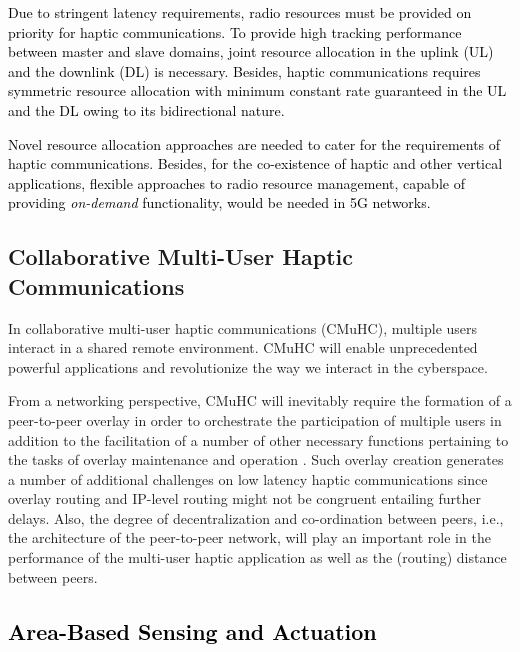 \documentclass[journal]{IEEEtran}
\begin{document}
\textcolor{black} {Due to stringent latency requirements, radio resources must be provided on priority for haptic communications. To provide high tracking performance between master and slave domains, joint resource allocation in the uplink (UL) and the downlink (DL) is necessary. Besides, haptic communications requires symmetric resource allocation with minimum constant rate guaranteed in the UL and the DL owing to its bidirectional nature.}

\textcolor{black}{Novel resource allocation approaches are needed to cater for the requirements of haptic communications. Besides, for the co-existence of haptic and other vertical applications, flexible approaches to radio resource management, capable of providing \emph{on-demand} functionality, would be needed in 5G networks. }






\subsection{Collaborative Multi-User Haptic Communications}
In collaborative multi-user haptic communications (CMuHC), multiple users interact in a shared remote environment. CMuHC will enable unprecedented powerful applications and revolutionize the way we interact in the cyberspace.


From a networking perspective, CMuHC will inevitably require the formation of a peer-to-peer overlay in order to orchestrate the participation of multiple users in addition to the facilitation of a number of other necessary functions pertaining to the tasks of overlay maintenance and operation \cite{overlay}.  Such overlay creation generates a number of additional challenges on low latency haptic communications since overlay routing and IP-level routing might not be congruent entailing further delays. Also, the degree of decentralization and co-ordination between peers, i.e., the architecture of the peer-to-peer network, will play an important role in the performance of the multi-user haptic application as well as the (routing) distance between peers.


\subsection{\textcolor{black}{Area-Based Sensing and Actuation}}
\end{document}
